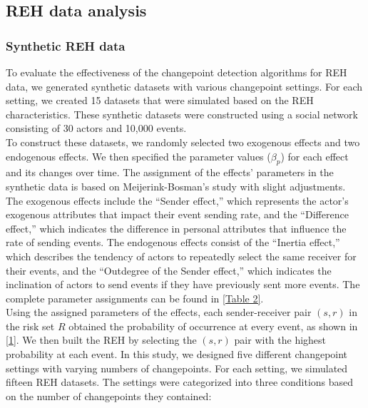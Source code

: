 \documentclass[]{interact}
\theoremstyle{plain}%
\theoremstyle{definition}
\theoremstyle{remark}
\begin{document}
    \subsection{REH data analysis} \label{sec:data}
   
	\subsubsection{Synthetic REH data} \label{sec:simulation}
	
	\hspace{0.2cm} To evaluate the effectiveness of the changepoint detection algorithms for REH data, we generated synthetic datasets with various changepoint settings. For each setting, we created 15 datasets that were simulated based on the REH characteristics. These synthetic datasets were constructed using a social network consisting of 30 actors and 10,000 events.\\
	
	To construct these datasets, we randomly selected two exogenous effects and two endogenous effects. We then specified the parameter values ($\beta_p$) for each effect and its changes over time. The assignment of the effects' parameters in the synthetic data is based on Meijerink-Bosman's study\cite{meijerink-bosmanDiscoveringTrendsSocial2022} with slight adjustments. The exogenous effects include the ``Sender effect,'' which represents the actor's exogenous attributes that impact their event sending rate, and the ``Difference effect,'' which indicates the difference in personal attributes that influence the rate of sending events. The endogenous effects consist of the ``Inertia effect,'' which describes the tendency of actors to repeatedly select the same receiver for their events, and the ``Outdegree of the Sender effect,'' which indicates the inclination of actors to send events if they have previously sent more events. The complete parameter assignments can be found in \autoref{Table 2}. \\
	
	Using the assigned parameters of the effects, each sender-receiver pair $(s,r)$ in the risk set $R$ obtained the probability of occurrence at every event, as shown in \autoref{1}. We then built the REH by selecting the $(s,r)$ pair with the highest probability at each event. In this study, we designed five different changepoint settings with varying numbers of changepoints. For each setting, we simulated fifteen REH datasets. The settings were categorized into three conditions based on the number of changepoints they contained:
	
\end{document}
